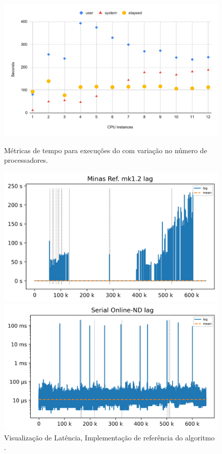 \begin{figure}[htb]
  \centering
  \begin{minipage}{0.49\textwidth}
    \centering
    \includegraphics[width=1\linewidth,page=1]{experiments/speedup-clean.pdf}
    \caption{Métricas de tempo para execuções do \mfog com variação no número de processadores.}
    \label{fig:speedup}
  \end{minipage}
  \hfill
  \begin{minipage}{0.49\textwidth}
    \centering
    \includegraphics[width=1\linewidth]{experiments/lag-java.png}
    \caption{Visualização de Latência, Implementação de referência do algoritmo \minas.}
    \label{fig:lag-java}
  \end{minipage}
  \vspace{5mm}
  \begin{minipage}{0.49\textwidth}
    \centering
    \includegraphics[width=1\linewidth]{experiments/lag-serial.png}

\end{minipage}
\end{figure}
